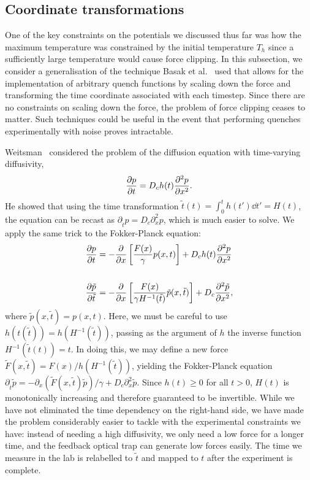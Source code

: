 \documentclass[hyperref={colorlinks=true, urlcolor=blue, citecolor=blue, final, bound}]{sfuthesis}
\begin{document}
\subsection{Coordinate transformations}
One of the key constraints on the potentials we discussed thus far was how the maximum temperature was constrained by the initial temperature $T_h$ since a sufficiently large temperature would cause force clipping. In this subsection, we consider a generalisation of the technique Basak et al.~\cite{Basak2026} used that allows for the implementation of arbitrary quench functions by scaling down the force and transforming the time coordinate associated with each timestep. Since there are no constraints on scaling down the force, the problem of force clipping ceases to matter. Such techniques could be useful in the event that performing quenches experimentally with noise proves intractable.

Weitsman~\cite{Weitsman1976} considered the problem of the diffusion equation with time-varying diffusivity,
\begin{equation}
    \pdv{p}{t} = D_ch(t)\pdv[2]{p}{x}.
\end{equation}
He showed that using the time transformation $\tilde t(t) = \int_0^t h(t')\dd{t'} = H(t)$, the equation can be recast as $\partial_{\tilde t} p = D_c\partial_x^2p$, which is much easier to solve. We apply the same trick to the Fokker-Planck equation:
\begin{align}
    \pdv{p}{t} &= -\pdv{x}\left[ \frac{F(x)}{\gamma}p(x,t) \right] + D_ch(t)\pdv[2]{p}{x}\\~\nonumber\\
    \pdv{\tilde p}{\tilde t} &= -\pdv{x}\left[ \frac{F(x)}{\gamma H^{-1}(\tilde t)}\tilde p(x,\tilde t) \right] + D_c\pdv[2]{\tilde p}{x},
\end{align}
where $\tilde p(x,\tilde t) = p(x,t)$. Here, we must be careful to use $h(t(\tilde t)) = h(H^{-1}(\tilde t))$, passing as the argument of $h$ the inverse function $H^{-1}(\tilde t(t))=t$. In doing this, we may define a new force $\tilde F(x,\tilde t) =F(x)/h(H^{-1}(\tilde t))$, yielding the Fokker-Planck equation $\partial_{\tilde t}\tilde p = -\partial_x(\tilde F(x,\tilde t) \tilde p)/\gamma + D_c\partial_x^2\tilde p$. Since $h(t)\geq 0$ for all $t>0$, $H(t)$ is monotonically increasing and therefore guaranteed to be invertible. While we have not eliminated the time dependency on the right-hand side, we have made the problem considerably easier to tackle with the experimental constraints we have: instead of needing a high diffusivity, we only need a low force for a longer time, and the feedback optical trap can generate low forces easily. The time we measure in the lab is relabelled to $\tilde t$ and mapped to $t$ after the experiment is complete.
\end{document}
